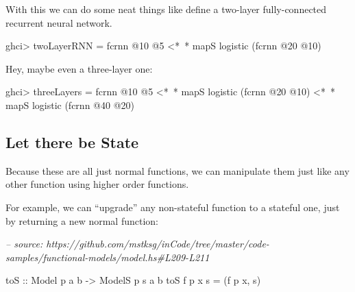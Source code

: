 \documentclass[]{article}
\newenvironment{Shaded}{}{}
\newcommand{\CommentTok}[1]{\textcolor[rgb]{0.38,0.63,0.69}{\textit{#1}}}
\newcommand{\DataTypeTok}[1]{\textcolor[rgb]{0.56,0.13,0.00}{#1}}
\newcommand{\DecValTok}[1]{\textcolor[rgb]{0.25,0.63,0.44}{#1}}
\newcommand{\FunctionTok}[1]{\textcolor[rgb]{0.02,0.16,0.49}{#1}}
\newcommand{\NormalTok}[1]{#1}
\newcommand{\OtherTok}[1]{\textcolor[rgb]{0.00,0.44,0.13}{#1}}
\begin{document}
With this we can do some neat things like define a two-layer fully-connected
recurrent neural network.

\begin{Shaded}
\begin{Highlighting}[]
\NormalTok{ghci}\FunctionTok{>}\NormalTok{ twoLayerRNN }\FunctionTok{=}\NormalTok{ fcrnn }\FunctionTok{@}\DecValTok{10} \FunctionTok{@}\DecValTok{5} \FunctionTok{<*~*}\NormalTok{ mapS logistic (fcrnn }\FunctionTok{@}\DecValTok{20} \FunctionTok{@}\DecValTok{10}\NormalTok{)}
\end{Highlighting}
\end{Shaded}

Hey, maybe even a three-layer one:

\begin{Shaded}
\begin{Highlighting}[]
\NormalTok{ghci}\FunctionTok{>}\NormalTok{ threeLayers }\FunctionTok{=}\NormalTok{ fcrnn }\FunctionTok{@}\DecValTok{10} \FunctionTok{@}\DecValTok{5}
               \FunctionTok{<*~*}\NormalTok{ mapS logistic (fcrnn }\FunctionTok{@}\DecValTok{20} \FunctionTok{@}\DecValTok{10}\NormalTok{)}
               \FunctionTok{<*~*}\NormalTok{ mapS logistic (fcrnn }\FunctionTok{@}\DecValTok{40} \FunctionTok{@}\DecValTok{20}\NormalTok{)}
\end{Highlighting}
\end{Shaded}

\hypertarget{let-there-be-state}{%
\subsection{Let there be State}\label{let-there-be-state}}

Because these are all just normal functions, we can manipulate them just like
any other function using higher order functions.

For example, we can ``upgrade'' any non-stateful function to a stateful one,
just by returning a new normal function:

\begin{Shaded}
\begin{Highlighting}[]
\CommentTok{-- source: https://github.com/mstksg/inCode/tree/master/code-samples/functional-models/model.hs#L209-L211}

\OtherTok{toS ::} \DataTypeTok{Model}\NormalTok{  p   a b}
    \OtherTok{->} \DataTypeTok{ModelS}\NormalTok{ p s a b}
\NormalTok{toS f p x s }\FunctionTok{=}\NormalTok{ (f p x, s)}
\end{Highlighting}
\end{Shaded}
\end{document}
